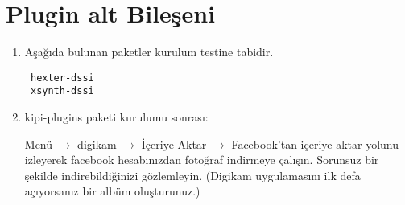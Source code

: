 \documentclass[a4paper,10pt]{article}
\begin{document}
\section{Plugin alt Bileşeni}
\begin{enumerate}
 \item Aşağıda bulunan paketler kurulum testine tabidir.
\begin{verbatim}
 hexter-dssi
 xsynth-dssi
\end{verbatim}


 \item kipi-plugins paketi kurulumu sonrası:

Menü $\rightarrow$ digikam $\rightarrow$ İçeriye Aktar $\rightarrow$ Facebook'tan içeriye aktar yolunu izleyerek facebook hesabınızdan fotoğraf indirmeye çalışın. Sorunsuz bir şekilde indirebildiğinizi gözlemleyin. (Digikam uygulamasını ilk defa açıyorsanız bir albüm oluşturunuz.)
\end{enumerate}
\end{document}
